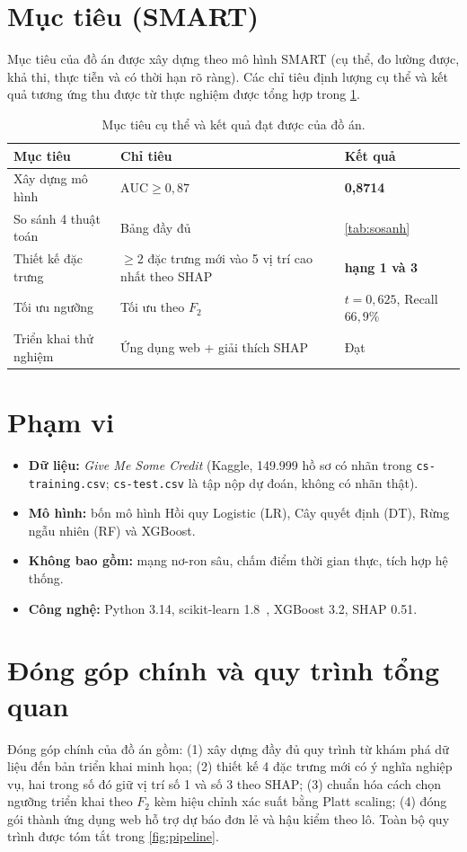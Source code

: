 \documentclass[12pt,a4paper,oneside]{report}
\theoremstyle{vnplain}
\theoremstyle{vndef}
\begin{document}
\section{Mục tiêu (SMART)}
Mục tiêu của đồ án được xây dựng theo mô hình SMART (cụ thể, đo lường được, khả thi, thực tiễn và có thời hạn rõ ràng). Các chỉ tiêu định lượng cụ thể và kết quả tương ứng thu được từ thực nghiệm được tổng hợp trong \cref{tab:smart}.
\begin{table}[htbp]\centering
\caption{Mục tiêu cụ thể và kết quả đạt được của đồ án.}
\label{tab:smart}
\begin{tabular}{p{4.2cm} p{5cm} p{4.2cm}}
\toprule
\textbf{Mục tiêu} & \textbf{Chỉ tiêu} & \textbf{Kết quả}\\
\midrule
Xây dựng mô hình & $\mathrm{AUC}\ge 0{,}87$ & \textbf{0,8714}\\
So sánh 4 thuật toán & Bảng đầy đủ & \cref{tab:sosanh}\\
Thiết kế đặc trưng & $\ge 2$ đặc trưng mới vào 5 vị trí cao nhất theo SHAP & \textbf{hạng 1 và 3}\\
Tối ưu ngưỡng & Tối ưu theo $F_2$ & $t=0{,}625$, Recall $66{,}9\%$\\
Triển khai thử nghiệm & Ứng dụng web + giải thích SHAP & Đạt\\
\bottomrule
\end{tabular}
\end{table}

\clearpage
\section{Phạm vi}
\begin{itemize}
  \item \textbf{Dữ liệu:} \emph{Give Me Some Credit} (Kaggle, 149.999 hồ sơ có nhãn trong
        \texttt{cs-training.csv}; \texttt{cs-test.csv} là tập nộp dự đoán, không có nhãn thật).
  \item \textbf{Mô hình:} bốn mô hình Hồi quy Logistic (LR), Cây quyết định (DT),
        Rừng ngẫu nhiên (RF) và XGBoost.
  \item \textbf{Không bao gồm:} mạng nơ-ron sâu, chấm điểm thời gian thực, tích hợp hệ thống.
  \item \textbf{Công nghệ:} Python 3.14, scikit-learn 1.8~\cite{pedregosa2011}, XGBoost 3.2, SHAP 0.51.
\end{itemize}

\section{Đóng góp chính và quy trình tổng quan}
Đóng góp chính của đồ án gồm: (1) xây dựng đầy đủ quy trình từ khám phá dữ liệu đến bản
triển khai minh họa; (2) thiết kế 4 đặc trưng mới có ý nghĩa nghiệp vụ, hai trong số đó giữ vị trí
số 1 và số 3 theo SHAP; (3) chuẩn hóa cách chọn ngưỡng triển khai theo $F_2$ kèm hiệu
chỉnh xác suất bằng Platt scaling; (4) đóng gói thành ứng dụng web hỗ trợ dự báo đơn lẻ
và hậu kiểm theo lô. Toàn bộ quy trình được tóm tắt trong \cref{fig:pipeline}.
\end{document}
